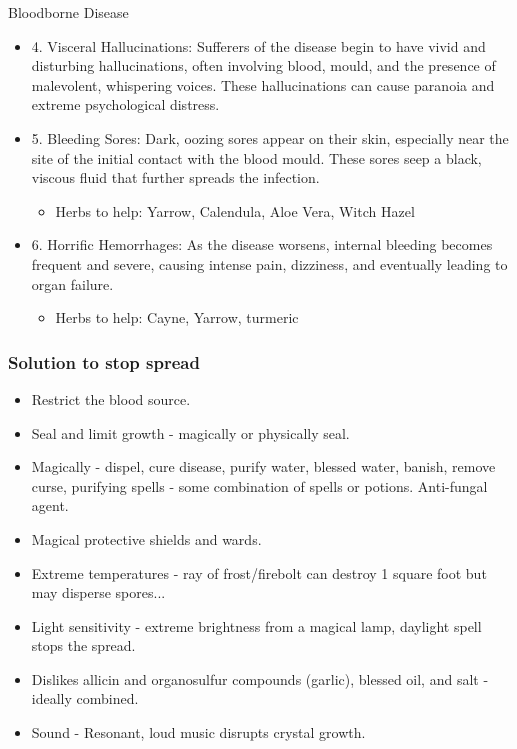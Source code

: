 \documentclass[10pt,onecolumn,twoside,openany,bg=full,layout=true]{dndbook}
\begin{document}
\begin{DndComment}{Bloodborne Disease}
\begin{itemize}
  \item 4. Visceral Hallucinations: Sufferers of the disease begin to have vivid and disturbing hallucinations, often
  involving blood, mould, and the presence of malevolent, whispering voices.
  These hallucinations can cause paranoia and extreme psychological distress.

  \item 5. Bleeding Sores: Dark, oozing sores appear on their skin, especially near the site of the initial contact with the blood mould.
  These sores seep a black, viscous fluid that further spreads the infection.


\begin{itemize}
\item Herbs to help: Yarrow, Calendula, Aloe Vera, Witch Hazel
\end{itemize}

\item 6. Horrific Hemorrhages: As the disease worsens, internal bleeding becomes frequent and severe, causing intense pain, dizziness, and eventually leading to organ failure.
\begin{itemize}
\item Herbs to help: Cayne, Yarrow, turmeric
\end{itemize}
\end{itemize}

\subsubsection*{Solution to stop spread}
\begin{itemize}
\item Restrict the blood source.
\item Seal and limit growth - magically or physically seal.
\item Magically - dispel, cure disease, purify water, blessed water, banish, remove curse, purifying spells - some combination of spells or potions.
Anti-fungal agent.
\item Magical protective shields and wards.
\item Extreme temperatures - ray of frost/firebolt can destroy 1 square foot but may disperse spores...
\item Light sensitivity - extreme brightness from a magical lamp, daylight spell stops the spread.
\item Dislikes allicin and organosulfur compounds (garlic), blessed oil, and salt - ideally combined.
\item Sound - Resonant, loud music disrupts crystal growth.
\end{itemize}


\end{DndComment}
\end{document}
